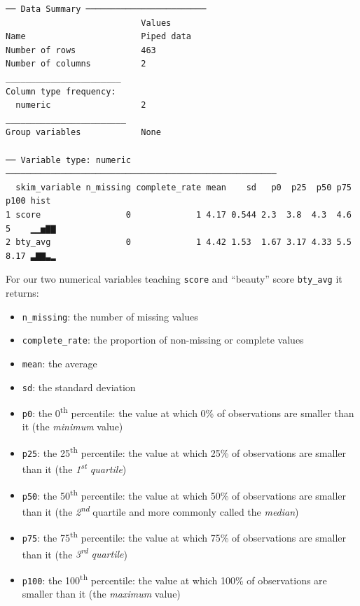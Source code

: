 \documentclass[
  letterpaper,
  DIV=11,
  numbers=noendperiod]{scrreprt}
\providecommand{\tightlist}{%
  \setlength{\itemsep}{0pt}\setlength{\parskip}{0pt}}\usepackage{longtable,booktabs,array}
\theoremstyle{definition}
\theoremstyle{remark}
\begin{document}
\begin{verbatim}
── Data Summary ────────────────────────
                           Values    
Name                       Piped data
Number of rows             463       
Number of columns          2         
_______________________              
Column type frequency:               
  numeric                  2         
________________________             
Group variables            None      

── Variable type: numeric ──────────────────────────────────────────────────────
  skim_variable n_missing complete_rate mean    sd   p0  p25  p50 p75 p100 hist 
1 score                 0             1 4.17 0.544 2.3  3.8  4.3  4.6 5    ▁▁▅▇▇
2 bty_avg               0             1 4.42 1.53  1.67 3.17 4.33 5.5 8.17 ▃▇▇▃▂ 
\end{verbatim}

For our two numerical variables teaching \texttt{score} and ``beauty''
score \texttt{bty\_avg} it returns:

\begin{itemize}
\tightlist
\item
  \texttt{n\_missing}: the number of missing values
\item
  \texttt{complete\_rate}: the proportion of non-missing or complete
  values
\item
  \texttt{mean}: the average
\item
  \texttt{sd}: the standard deviation
\item
  \texttt{p0}: the 0\textsuperscript{th} percentile: the value at which
  0\% of observations are smaller than it (the \emph{minimum} value)
\item
  \texttt{p25}: the 25\textsuperscript{th} percentile: the value at
  which 25\% of observations are smaller than it (the
  \emph{1\textsuperscript{st} quartile})
\item
  \texttt{p50}: the 50\textsuperscript{th} percentile: the value at
  which 50\% of observations are smaller than it (the
  \emph{2\textsuperscript{nd}} quartile and more commonly called the
  \emph{median})
\item
  \texttt{p75}: the 75\textsuperscript{th} percentile: the value at
  which 75\% of observations are smaller than it (the
  \emph{3\textsuperscript{rd} quartile})
\item
  \texttt{p100}: the 100\textsuperscript{th} percentile: the value at
  which 100\% of observations are smaller than it (the \emph{maximum}
  value)
\end{itemize}
\end{document}
